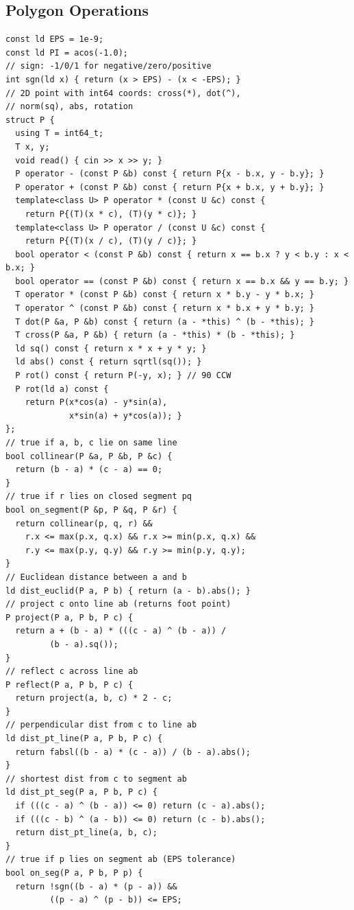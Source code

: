 \subsection{Polygon Operations}
\begin{verbatim}
const ld EPS = 1e-9;
const ld PI = acos(-1.0);
// sign: -1/0/1 for negative/zero/positive
int sgn(ld x) { return (x > EPS) - (x < -EPS); }
// 2D point with int64 coords: cross(*), dot(^),
// norm(sq), abs, rotation
struct P {
  using T = int64_t;
  T x, y;
  void read() { cin >> x >> y; }
  P operator - (const P &b) const { return P{x - b.x, y - b.y}; }
  P operator + (const P &b) const { return P{x + b.x, y + b.y}; }
  template<class U> P operator * (const U &c) const {
    return P{(T)(x * c), (T)(y * c)}; }
  template<class U> P operator / (const U &c) const {
    return P{(T)(x / c), (T)(y / c)}; }
  bool operator < (const P &b) const { return x == b.x ? y < b.y : x < b.x; }
  bool operator == (const P &b) const { return x == b.x && y == b.y; }
  T operator * (const P &b) const { return x * b.y - y * b.x; }
  T operator ^ (const P &b) const { return x * b.x + y * b.y; }
  T dot(P &a, P &b) const { return (a - *this) ^ (b - *this); }
  T cross(P &a, P &b) { return (a - *this) * (b - *this); }
  ld sq() const { return x * x + y * y; }
  ld abs() const { return sqrtl(sq()); }
  P rot() const { return P(-y, x); } // 90 CCW
  P rot(ld a) const {
    return P(x*cos(a) - y*sin(a),
             x*sin(a) + y*cos(a)); }
};
// true if a, b, c lie on same line
bool collinear(P &a, P &b, P &c) {
  return (b - a) * (c - a) == 0;
}
// true if r lies on closed segment pq
bool on_segment(P &p, P &q, P &r) {
  return collinear(p, q, r) &&
    r.x <= max(p.x, q.x) && r.x >= min(p.x, q.x) &&
    r.y <= max(p.y, q.y) && r.y >= min(p.y, q.y);
}
// Euclidean distance between a and b
ld dist_euclid(P a, P b) { return (a - b).abs(); }
// project c onto line ab (returns foot point)
P project(P a, P b, P c) {
  return a + (b - a) * (((c - a) ^ (b - a)) /
         (b - a).sq());
}
// reflect c across line ab
P reflect(P a, P b, P c) {
  return project(a, b, c) * 2 - c;
}
// perpendicular dist from c to line ab
ld dist_pt_line(P a, P b, P c) {
  return fabsl((b - a) * (c - a)) / (b - a).abs();
}
// shortest dist from c to segment ab
ld dist_pt_seg(P a, P b, P c) {
  if (((c - a) ^ (b - a)) <= 0) return (c - a).abs();
  if (((c - b) ^ (a - b)) <= 0) return (c - b).abs();
  return dist_pt_line(a, b, c);
}
// true if p lies on segment ab (EPS tolerance)
bool on_seg(P a, P b, P p) {
  return !sgn((b - a) * (p - a)) &&
         ((p - a) ^ (p - b)) <= EPS;

\end{verbatim}
